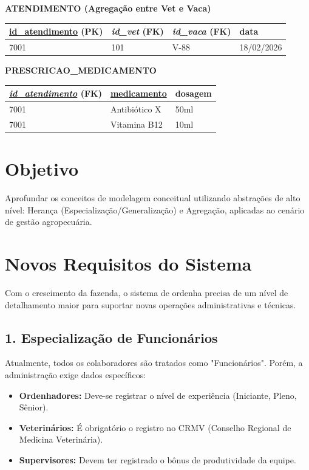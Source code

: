 \documentclass[12pt]{article}
\begin{document}
\begin{table}[H]
    \textbf{ATENDIMENTO (Agregação entre Vet e Vaca)}\\
    \begin{tabular}{|l|l|l|l|}
    \hline
    \rowcolor{tableheader} \underline{id\_atendimento} (PK) & \textit{id\_vet} (FK) & \textit{id\_vaca} (FK) & data \\ \hline
    7001 & 101 & V-88 & 18/02/2026 \\ \hline
    \end{tabular}

    \vspace{0.4cm}

    \textbf{PRESCRICAO\_MEDICAMENTO}\\
    \begin{tabular}{|l|l|l|}
    \hline
    \rowcolor{tableheader} \underline{\textit{id\_atendimento}} (FK) & \underline{medicamento} & dosagem \\ \hline
    7001 & Antibiótico X & 50ml \\ \hline
    7001 & Vitamina B12 & 10ml \\ \hline
    \end{tabular}
\end{table}
\section*{Objetivo}
Aprofundar os conceitos de modelagem conceitual utilizando abstrações de alto nível: Herança (Especialização/Generalização) e Agregação, aplicadas ao cenário de gestão agropecuária.

\section*{Novos Requisitos do Sistema}

Com o crescimento da fazenda, o sistema de ordenha precisa de um nível de detalhamento maior para suportar novas operações administrativas e técnicas.

\subsection*{1. Especialização de Funcionários}
Atualmente, todos os colaboradores são tratados como "Funcionários". Porém, a administração exige dados específicos:
\begin{itemize}
    \item \textbf{Ordenhadores:} Deve-se registrar o nível de experiência (Iniciante, Pleno, Sênior).
    \item \textbf{Veterinários:} É obrigatório o registro no CRMV (Conselho Regional de Medicina Veterinária).
    \item \textbf{Supervisores:} Devem ter registrado o bônus de produtividade da equipe.
\end{itemize}
\end{document}
